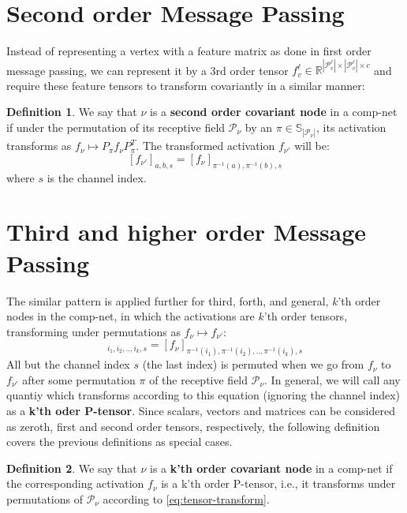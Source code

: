 \documentclass[sigchi]{acmart}
\theoremstyle{definition}
\newtheorem{definition}{Definition}[section]
\theoremstyle{theorem}
\theoremstyle{corollary}
\theoremstyle{lemma}
\theoremstyle{remark}
\theoremstyle{prop}
\begin{document}
\section{Second order Message Passing}
\label{section:ccn2d}

Instead of representing a vertex with a feature matrix as done in first order message passing, we can represent it by a 3rd order tensor $f_v^\ell \in \mathbb{R}^{|\mathcal{P}_v^\ell| \times |\mathcal{P}_v^\ell| \times c}$ and require these feature tensors to transform covariantly in a similar manner:
\begin{definition}
We say that $\nu$ is a \textbf{second order covariant node} in a comp-net if under the permutation of its receptive field $\mathcal{P}_\nu$ by an $\pi \in \mathbb{S}_{|\mathcal{P}_\nu|}$, its activation transforms as $f_\nu \mapsto P_\pi f_\nu P_\pi^T$. The transformed activation $f_{\nu'}$ will be:
$$[f_{\nu'}]_{a, b, s} = [f_\nu]_{\pi^{-1}(a), \pi^{-1}(b), s}$$
where $s$ is the channel index.
\end{definition}

\section{Third and higher order Message Passing}

The similar pattern is applied further for third, forth, and general, $k$'th order nodes in the comp-net, in which the activations are $k$'th order tensors, transforming under permutations as $f_\nu \mapsto f_{\nu'}$:
\begin{equation}
[f_{\nu'}]_{i_1, i_2, .., i_k, s} = [f_\nu]_{\pi^{-1}(i_1), \pi^{-1}(i_2), .., \pi^{-1}(i_k), s}
\label{eq:tensor-transform}
\end{equation}
All but the channel index $s$ (the last index) is permuted when we go from $f_\nu$ to $f_{\nu'}$ after some permutation $\pi$ of the receptive field $\mathcal{P}_\nu$. In general, we will call any quantiy which transforms according to this equation (ignoring the channel index) as a \textbf{k'th oder P-tensor}. Since scalars, vectors and matrices can be considered as zeroth, first and second order tensors, respectively, the following definition covers the previous definitions as special cases.
\begin{definition}
We say that $\nu$ is a \textbf{k'th order covariant node} in a comp-net if the corresponding activation $f_\nu$ is a k'th order P-tensor, i.e., it transforms under permutations of $\mathcal{P}_\nu$ according to \ref{eq:tensor-transform}. 
\end{definition}
\end{document}
